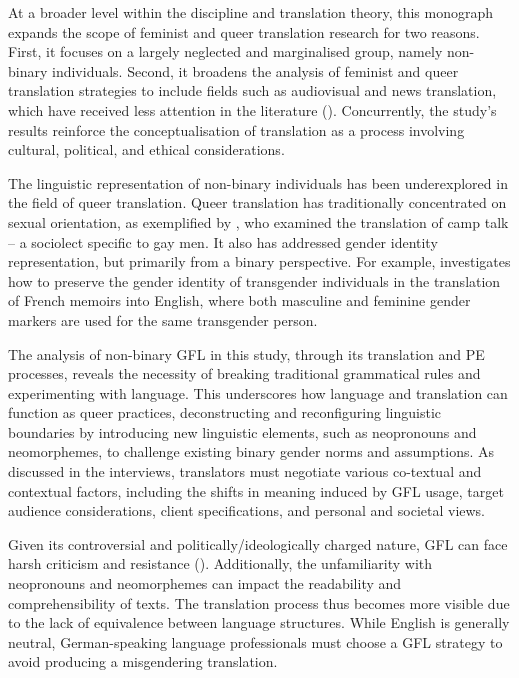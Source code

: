 At a broader level within the discipline and translation theory, this monograph expands the scope of feminist and queer translation research for two reasons. First, it focuses on a largely neglected and marginalised group, namely non-binary individuals. Second, it broadens the analysis of feminist and queer translation strategies to include fields such as audiovisual and news translation, which have received less attention in the literature (\cite{baer2017introduction,von2020routledge}). Concurrently, the study's results reinforce the conceptualisation of translation as a process involving cultural, political, and ethical considerations.

The linguistic representation of non-binary individuals has been underexplored in the field of queer translation. Queer translation has traditionally concentrated on sexual orientation, as exemplified by \textcite{harvey1998translating}, who examined the translation of camp talk -- a sociolect specific to gay men. It also has addressed gender identity representation, but primarily from a binary perspective. For example, \textcite{rose2016keeping} investigates how to preserve the gender identity of transgender individuals in the translation of French memoirs into English, where both masculine and feminine gender markers are used for the same transgender person.

The analysis of non-binary GFL in this study, through its translation and PE processes, reveals the necessity of breaking traditional grammatical rules and experimenting with language. This underscores how language and translation can function as queer practices, deconstructing and reconfiguring linguistic boundaries by introducing new linguistic elements, such as neopronouns and neomorphemes, to challenge existing binary gender norms and assumptions. As discussed in the interviews, translators must negotiate various co-textual and contextual factors, including the shifts in meaning induced by GFL usage, target audience considerations, client specifications, and personal and societal views.

Given its controversial and politically/ideologically charged nature, GFL can face harsh criticism and resistance (\cite{vergoossen2020four}). Additionally, the unfamiliarity with neopronouns and neomorphemes can impact the readability and comprehensibility of texts. The translation process thus becomes more visible due to the lack of equivalence between language structures. While English is generally neutral, German-speaking language professionals must choose a GFL strategy to avoid producing a misgendering translation.

